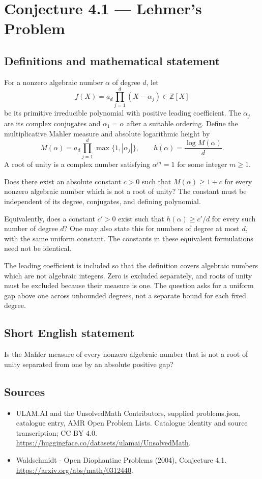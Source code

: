 \documentclass[11pt,a4paper]{article}
\begin{document}
\section*{Conjecture 4.1 — Lehmer's Problem}\label{statement}

\subsection{Definitions and mathematical statement}
For a nonzero algebraic number $\alpha$ of degree $d$, let
\[
f(X)=a_d\prod_{j=1}^d(X-\alpha_j)\in\mathbb Z[X]
\]
be its primitive irreducible polynomial with positive leading coefficient. The $\alpha_j$ are its complex conjugates and $\alpha_1=\alpha$ after a suitable ordering. Define the multiplicative Mahler measure and absolute logarithmic height by
\[
M(\alpha)=a_d\prod_{j=1}^d\max\{1,|\alpha_j|\},
\qquad h(\alpha)=\frac{\log M(\alpha)}d.
\]
A root of unity is a complex number satisfying $\alpha^m=1$ for some integer $m\ge1$.

Does there exist an absolute constant $c>0$ such that $M(\alpha)\ge1+c$ for every nonzero algebraic number which is not a root of unity? The constant must be independent of its degree, conjugates, and defining polynomial.

Equivalently, does a constant $c'>0$ exist such that $h(\alpha)\ge c'/d$ for every such number of degree $d$? One may also state this for numbers of degree at most $d$, with the same uniform constant. The constants in these equivalent formulations need not be identical.

The leading coefficient is included so that the definition covers algebraic numbers which are not algebraic integers. Zero is excluded separately, and roots of unity must be excluded because their measure is one. The question asks for a uniform gap above one across unbounded degrees, not a separate bound for each fixed degree.
\subsection{Short English statement}
Is the Mahler measure of every nonzero algebraic number that is not a root of unity separated from one by an absolute positive gap?
\subsection{Sources}
\begin{itemize}
\item[S1] ULAM.AI and the UnsolvedMath Contributors, supplied problems.json, catalogue entry, AMR Open Problem Lists. Catalogue identity and source transcription; CC BY 4.0.
\url{https://huggingface.co/datasets/ulamai/UnsolvedMath}.
\item[S2] Waldschmidt - Open Diophantine Problems (2004), Conjecture 4.1. 
\url{https://arxiv.org/abs/math/0312440}.
\end{itemize}
\end{document}
